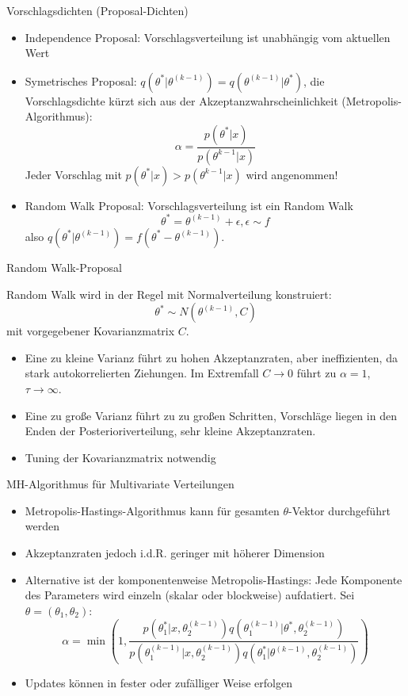 \documentclass[ignorenonframetext,]{beamer}
\begin{document}
\begin{frame}{Vorschlagsdichten (Proposal-Dichten)}

\begin{itemize}
\item Independence Proposal: Vorschlagsverteilung ist unabhängig vom aktuellen Wert
\item Symetrisches Proposal: $q(\theta^*|\theta^{(k-1)})=q(\theta^{(k-1)}|\theta^*)$,  die Vorschlagsdichte kürzt sich aus der Akzeptanzwahrscheinlichkeit (Metropolis-Algorithmus):
\[
\alpha=\frac{p(\theta^*|x)}{p(\theta^{k-1}|x)}
\]
Jeder Vorschlag mit $p(\theta^*|x)>p(\theta^{k-1}|x)$ wird angenommen!
\item Random Walk Proposal: Vorschlagsverteilung ist ein Random Walk
\[
\theta^* = \theta^{(k-1)}+\epsilon, \epsilon\sim f
\]
also $q(\theta^*|\theta^{(k-1)})=f(\theta^*-\theta^{(k-1)})$.
\end{itemize}

\end{frame}

\begin{frame}{Random Walk-Proposal}

Random Walk wird in der Regel mit Normalverteilung konstruiert: \[
\theta^* \sim N(\theta^{(k-1)},C)
\] mit vorgegebener Kovarianzmatrix \(C\).

\begin{itemize}
\item Eine zu kleine Varianz führt zu hohen Akzeptanzraten, aber ineffizienten, da stark autokorrelierten Ziehungen. Im Extremfall $C\to 0$ führt zu $\alpha = 1$, $\tau \to \infty$. 
\item Eine zu große Varianz führt zu zu großen Schritten, Vorschläge liegen in den Enden der Posterioriverteilung, sehr kleine Akzeptanzraten.
\item Tuning der Kovarianzmatrix notwendig
\end{itemize}

\end{frame}

\begin{frame}{MH-Algorithmus für Multivariate Verteilungen}

\begin{itemize}
\item Metropolis-Hastings-Algorithmus kann für gesamten $\theta$-Vektor durchgeführt werden
\item Akzeptanzraten jedoch i.d.R. geringer mit höherer Dimension
\item Alternative ist der komponentenweise Metropolis-Hastings: Jede Komponente des Parameters wird einzeln (skalar oder blockweise) aufdatiert. Sei $\theta=(\theta_1,\theta_2)$:
\[
\alpha=\min\left(1,\frac{p(\theta_1^*|x,\theta_2^{(k-1)})q(\theta^{(k-1)}_1|\theta^*,\theta_2^{(k-1)})}{p(\theta^{(k-1)}_1|x,\theta_2^{(k-1)})q(\theta^*_1|\theta^{(k-1)},\theta_2^{(k-1)})}\right)
\]
\item Updates können in fester oder zufälliger Weise erfolgen
\end{itemize}

\end{frame}
\end{document}
